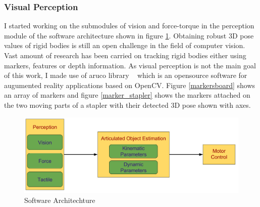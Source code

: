 \documentclass[12pt,a4paper]{report}
\begin{document}
\subsubsection*{Visual Perception}
I started working on the submodules of vision and force-torque in the perception module of the software architecture shown in figure \ref{SoftArc}. Obtaining robust 3D pose values of rigid bodies is still an open challenge in the field of computer vision. Vast amount of research has been carried on tracking rigid bodies either using markers, features or depth information. As visual perception is not the main goal of this work, I made use of aruco library ~\cite{Aruco2014} which is an opensource software for augumented reality applications based on OpenCV. Figure \ref{markersboard} shows an array of markers and figure \ref{marker_stapler} shows the markers attached on the two moving parts of a stapler with their detected 3D pose shown with axes.

\begin{figure}[H]
	\centering
	\includegraphics[scale=0.3]{figures/SoftwareArch_year1.png}
	\caption{Software Architechture}		
	\label{SoftArc}
\end{figure}
\end{document}
